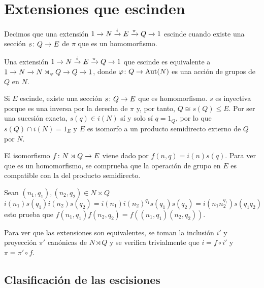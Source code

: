 
\section{Extensiones que escinden}\label{sec:split}


\begin{definicion}	
	Decimos que una extensión $\extension i \pi N E Q$ escinde cuando existe una sección $\homo s Q E$ de $\pi$ que es un homomorfismo.
\end{definicion}

\begin{teorema}\label{splitext}
	Una extensión $\extension i \pi N E Q$ que escinde es equivalente a $\extension {} {} N {N\rtimes_{\varphi} Q} Q$, donde $\homo \varphi Q \Aut(N)$ es una acción de grupos de $Q$ en $N$.
	\begin{demostracion}
		Si $E$ escinde, existe una sección $\homo s Q E$ que es homomorfismo. $s$ es inyectiva porque es una inversa por la derecha de $\pi$ y, por tanto, $Q\cong s(Q) \leq E$.
		Por ser una sucesión exacta, $s(q)\in i(N)$ sí y solo sí $q = 1_Q$, por lo que $s(Q)\cap i(N) = {1_E}$ y $E$ es isomorfo a un producto semidirecto externo de $Q$ por $N$.
		
		El isomorfismo $\homo f {N\rtimes Q} E$ viene dado por $f(n,q) = i(n)s(q)$. Para ver que es un homomorfismo, se comprueba que la operación de grupo en $E$ es compatible con la del producto semidirecto.
		
		Sean $(n_1,q_1),(n_2,q_2)\in N\times Q$
		\begin{equation*}
			i(n_1)s(q_1)i(n_2)s(q_2) = i(n_1)i(n_2)^{q_1}s(q_1)s(q_2) = i(n_1 n_2^{q_1})s(q_1q_2) 
		\end{equation*}
		esto prueba que $f(n_1,q_1)f(n_2,q_2) = f((n_1,q_1)(n_2,q_2))$.
		
		Para ver que las extensiones son equivalentes, se toman la inclusión $i'$ y proyección $\pi'$ canónicas de $N\rtimes Q$ y se verifica trivialmente que $i=f \circ i'$ y $\pi = \pi' \circ f$.
	\end{demostracion}
\end{teorema}


\subsection{Clasificación de las escisiones}

